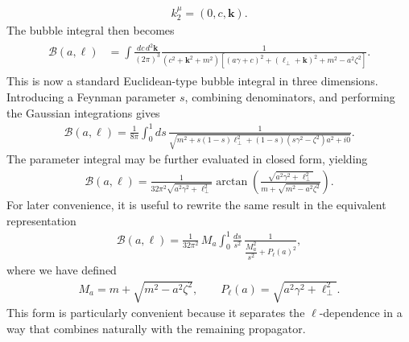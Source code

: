 \begin{align}
k_2^\mu=(0,c,\boldsymbol{k}).
\end{align}
The bubble integral then becomes
\begin{align}
\begin{split}
\mathcal{B}(a,\ell)
&=
\int
\frac{dc\,d^2\boldsymbol{k}}{(2\pi)^3}
\frac{1}{
(c^2+\boldsymbol{k}^2+m^2)
\left[(a\gamma+c)^2+(\boldsymbol{\ell}_\perp+\boldsymbol{k})^2+m^2-a^2\zeta^2\right]
}.
\end{split}
\end{align}
This is now a standard Euclidean-type bubble integral in three dimensions. Introducing a Feynman parameter $s$, combining denominators, and performing the Gaussian integrations gives
\begin{align}
\mathcal{B}(a,\ell)
=
\frac{1}{8\pi}\int_0^1 ds\,
\frac{1}{
\sqrt{
m^2+s(1-s)\boldsymbol{\ell}_\perp^2+(1-s)(s\gamma^2-\zeta^2)a^2+i0
}
}.
\end{align}
The parameter integral may be further evaluated in closed form, yielding
\begin{align}
\mathcal{B}(a,\ell)
=
\frac{1}{32\pi^2\sqrt{a^2\gamma^2+\boldsymbol{\ell}_\perp^2}}
\arctan\!\left(
\frac{\sqrt{a^2\gamma^2+\boldsymbol{\ell}_\perp^2}}
{m+\sqrt{m^2-a^2\zeta^2}}
\right).
\end{align}
For later convenience, it is useful to rewrite the same result in the equivalent representation
\begin{align}
\mathcal{B}(a,\ell)
=
\frac{1}{32\pi^2}\,
M_a
\int_0^1 \frac{ds}{s^2}\,
\frac{1}{\dfrac{M_a^2}{s^2}+P_\ell(a)^2},
\end{align}
where we have defined
\begin{align}
M_a=m+\sqrt{m^2-a^2\zeta^2},
\qquad
P_\ell(a)=\sqrt{a^2\gamma^2+\boldsymbol{\ell}_\perp^2}.
\end{align}
This form is particularly convenient because it separates the $\ell$-dependence in a way that combines naturally with the remaining propagator.

